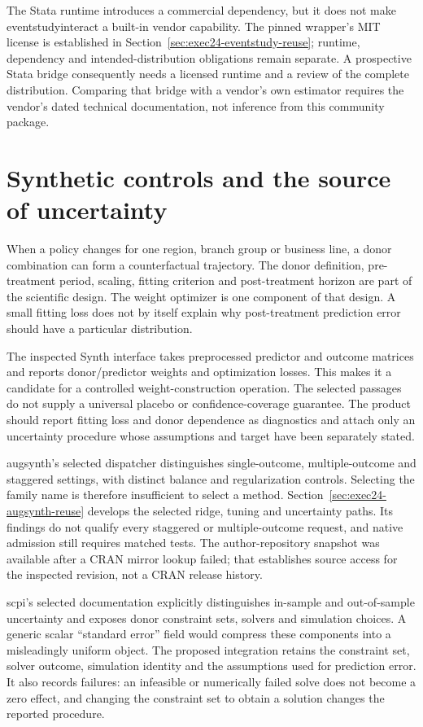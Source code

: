 The Stata runtime introduces a commercial dependency, but it does not make
eventstudyinteract a built-in vendor capability. The pinned wrapper's MIT
license is established in Section~\ref{sec:exec24-eventstudy-reuse}; runtime,
dependency and intended-distribution obligations remain separate. A prospective
Stata bridge consequently needs a licensed runtime and a review of the complete
distribution. Comparing that bridge with a vendor's own estimator
requires the vendor's dated technical documentation, not inference from this
community package.

\section{Synthetic controls and the source of uncertainty}

When a policy changes for one region, branch group or business line, a donor
combination can form a counterfactual trajectory. The donor definition,
pre-treatment period, scaling, fitting criterion and post-treatment horizon
are part of the scientific design. The weight optimizer is one component of
that design. A small fitting loss does not by itself explain why post-treatment
prediction error should have a particular distribution.

The inspected Synth interface takes preprocessed predictor and outcome
matrices and reports donor/predictor weights and optimization losses. This
makes it a candidate for a controlled weight-construction operation. The
selected passages do not supply a universal placebo or confidence-coverage
guarantee. The product should report fitting loss and donor dependence as
diagnostics and attach only an uncertainty procedure whose assumptions and
target have been separately stated. \citep{v12_sw_synth}

augsynth's selected dispatcher distinguishes single-outcome, multiple-outcome
and staggered settings, with distinct balance and regularization controls.
Selecting the family name is therefore insufficient to select a method.
Section~\ref{sec:exec24-augsynth-reuse} develops the selected ridge, tuning and
uncertainty paths. Its findings do not qualify every staggered or
multiple-outcome request, and native admission still requires matched tests.
The author-repository snapshot was available after a CRAN
mirror lookup failed; that establishes source access for the inspected
revision, not a CRAN release history. \citep{v12_sw_augsynth}

scpi's selected documentation explicitly distinguishes in-sample and
out-of-sample uncertainty and exposes donor constraint sets, solvers and
simulation choices. A generic scalar ``standard error'' field would compress
these components into a misleadingly uniform object. The proposed integration
retains the constraint set, solver outcome, simulation identity and the
assumptions used for prediction error. It also records failures: an infeasible
or numerically failed solve does not become a zero effect, and changing the
constraint set to obtain a solution changes the reported procedure.
\citep{v12_sw_scpi}

